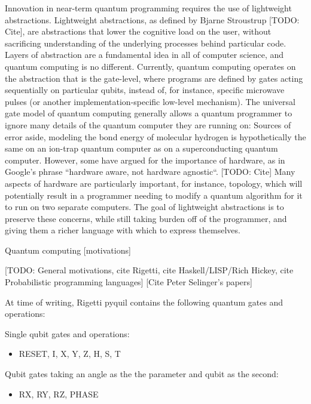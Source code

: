 \documentclass[journal]{article}
\begin{document}
Innovation in near-term quantum programming requires the use of lightweight abstractions. 
Lightweight abstractions, as defined by Bjarne Stroustrup [TODO: Cite], are abstractions that lower the cognitive load on the user, without sacrificing understanding of the underlying processes behind particular code.
Layers of abstraction are a fundamental idea in all of computer science, and quantum computing is no different.
Currently, quantum computing operates on the abstraction that is the gate-level, where programs are defined by gates acting sequentially on particular qubits, instead of, for instance, specific microwave pulses (or another implementation-specific low-level mechanism).
The universal gate model of quantum computing generally allows a quantum programmer to ignore many details of the quantum computer they are running on: Sources of error aside, modeling the bond energy of molecular hydrogen is hypothetically the same on an ion-trap quantum computer as on a superconducting quantum computer.
However, some have argued for the importance of hardware, as in Google's phrase ``hardware aware, not hardware agnostic``. [TODO: Cite]
Many aspects of hardware are particularly important, for instance, topology, which will potentially result in a programmer needing to modify a quantum algorithm for it to run on two separate computers.
The goal of lightweight abstractions is to preserve these concerns, while still taking burden off of the programmer, and giving them a richer language with which to express themselves.

Quantum computing [motivations]

[TODO: General motivations, cite Rigetti, cite Haskell/LISP/Rich Hickey, cite Probabilistic programming languages]
[Cite Peter Selinger's papers]

At time of writing, Rigetti pyquil contains the following quantum gates and operations:

Single qubit gates and operations:

\begin{itemize}
    \item RESET, I, X, Y, Z, H, S, T
\end{itemize}

Qubit gates taking an angle as the the parameter and qubit as the second:

\begin{itemize}
    \item RX, RY, RZ, PHASE
\end{itemize}
\end{document}
